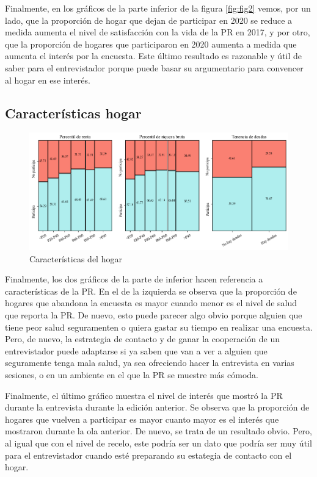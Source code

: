Finalmente, en los gráficos de la parte inferior de la figura \ref{fig:fig2} vemos, por un lado, que la proporción de hogar que dejan de participar en 2020 se reduce a medida aumenta el nivel de satisfacción con la vida de la PR en 2017, y por otro, que la proporción de hogares que participaron en 2020 aumenta a medida que aumenta el interés por la encuesta. Este último resultado es razonable y útil de saber para el entrevistador porque puede basar su argumentario para convencer al hogar en ese interés.

\subsection*{Características hogar}

\begin{figure}[h]
	\centering
	\includegraphics[width=1\textwidth]{figs/figure3.png}
	\caption{Características del hogar}
	\label{fig:fig3}
\end{figure}



Finalmente, los dos gráficos de la parte de inferior hacen referencia a características de la PR. En el de la izquierda se observa que la proporción de hogares que abandona la encuesta es mayor cuando menor es el nivel de salud que reporta la PR. De nuevo, esto puede parecer algo obvio porque alguien que tiene peor salud seguramenten o quiera gastar su tiempo en realizar una encuesta. Pero, de nuevo, la estrategia de contacto y de ganar la cooperación de un entrevistador puede adaptarse si ya saben que van a ver a alguien que seguramente tenga mala salud, ya sea ofreciendo hacer la entrevista en varias sesiones, o en un ambiente en el que la PR se muestre más cómoda.

Finalmente, el último gráfico muestra el nivel de interés que mostró la PR durante la entrevista durante la edición anterior. Se observa que la proporción de hogares que vuelven a participar es mayor cuanto mayor es el interés que mostraron durante la ola anterior. De nuevo, se trata de un resultado obvio. Pero, al igual que con el nivel de recelo, este podría ser un dato que podría ser muy útil para el entrevistador cuando esté preparando su estategia de contacto con el hogar.

